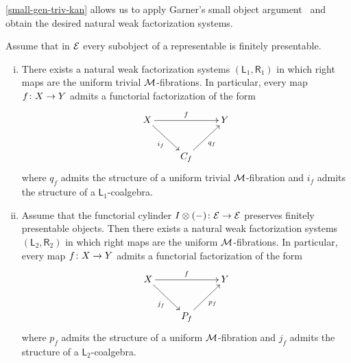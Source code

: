 \documentclass[reqno,10pt,a4paper,oneside,draft]{amsart}
\begin{document}
\cref{small-gen-triv-kan} allows us to apply Garner's small object argument~\cite{garner:small-object-argument} and obtain the desired natural weak factorization systems.

\begin{theorem} \label{thm:sset-cset-nwfs}
Assume that in $\cal{E}$ every subobject of a representable is finitely presentable.
\begin{enumerate}[(i)]
\item There exists a natural weak factorization systems $(\mathsf{L}_1, \mathsf{R}_1)$ in which right maps are the uniform trivial $\cal{M}$-fibrations.
In particular, every map $f \co X \to Y$ admits a functorial factorization of the form
\[
\xymatrix{
  X
  \ar[rr]^{f}
  \ar[dr]_{i_f}
&&
  Y
\\&
  C_f
  \ar[ur]_{q_f}
}
\]
where $q_f$ admits the structure of a uniform trivial $\cal{M}$-fibration and $i_f$ admits the structure of a $\mathsf{L}_1$-coalgebra.
\item Assume that the functorial cylinder $\interval \otimes (-) \co \cal{E} \to \cal{E}$ preserves finitely presentable objects.
Then there exists a natural weak factorization systems $(\mathsf{L}_2, \mathsf{R}_2)$ in which right maps are the uniform $\cal{M}$-fibrations.
In particular, every map $f \co X \to Y$ admits a functorial factorization of the form
\[
\xymatrix{
  X
  \ar[rr]^{f}
  \ar[dr]_{j_f}
&&
  Y
\\&
  P_f
  \ar[ur]_{p_f}
}
\]
where $p_f$ admits the structure of a uniform $\cal{M}$-fibration and $j_f$ admits the structure of a $\mathsf{L}_2$-coalgebra.
\end{enumerate}
\end{theorem}
\end{document}
